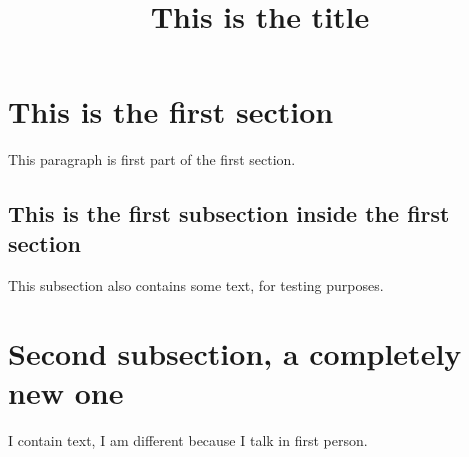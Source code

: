 \documentclass[11pt]{article}
\title{This is the title}
\begin{document}
\maketitle
   
\section{This is the first section}

This paragraph is first part of the first section.

\subsection{This is the first subsection inside the first section}

This subsection also contains some text, for testing purposes.

\section{Second subsection, a completely new one}

I contain text, I am different because I talk in first person.
\end{document}
